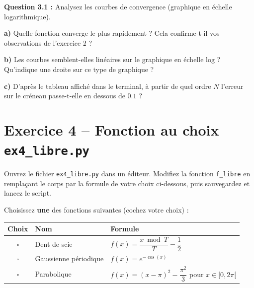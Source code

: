 \documentclass[12pt,a4paper]{article}
\newcommand{\cadreReponse}[1][4]{%
    \begin{mdframed}[
        backgroundcolor=repbg,
        linecolor=repframe,
        linewidth=1pt,
        roundcorner=4pt,
        innertopmargin=6pt,
        innerbottommargin=6pt,
    ]
    \vspace{#1\baselineskip}
    \end{mdframed}%
}
\begin{document}
\begin{exercicebox}
\textbf{Question 3.1 :} Analysez les courbes de convergence (graphique en échelle logarithmique).
\end{exercicebox}

\medskip
\noindent\textbf{a)} Quelle fonction converge le plus rapidement ? Cela confirme-t-il vos observations de l'exercice 2 ?

\cadreReponse[2]

\noindent\textbf{b)} Les courbes semblent-elles linéaires sur le graphique en échelle log ? Qu'indique une droite sur ce type de graphique ?

\cadreReponse[2]

\noindent\textbf{c)} D'après le tableau affiché dans le terminal, à partir de quel ordre $N$ l'erreur sur le créneau passe-t-elle en dessous de $0.1$ ?

\cadreReponse[2]

\section{Exercice 4 -- Fonction au choix \hfill\normalsize\texttt{ex4\_libre.py}}

\begin{fichierbox}
Ouvrez le fichier \texttt{ex4\_libre.py} dans un éditeur. Modifiez la fonction \texttt{f\_libre} en remplaçant le corps par la formule de votre choix ci-dessous, puis sauvegardez et lancez le script.
\end{fichierbox}

\medskip
Choisissez \textbf{une} des fonctions suivantes (cochez votre choix) :

\begin{center}
\renewcommand{\arraystretch}{1.8}
\begin{tabular}{|c|l|l|}
    \hline
    \textbf{Choix} & \textbf{Nom} & \textbf{Formule} \\
    \hline
    $\square$ & Dent de scie    & $f(x) = \dfrac{x \bmod T}{T} - \dfrac{1}{2}$ \\
    \hline
    $\square$ & Gaussienne périodique & $f(x) = e^{-\cos(x)}$ \\
    \hline
    $\square$ & Parabolique     & $f(x) = (x - \pi)^2 - \dfrac{\pi^2}{3}$ \quad pour $x \in [0, 2\pi[$ \\
    \hline
\end{tabular}
\end{center}
\end{document}
